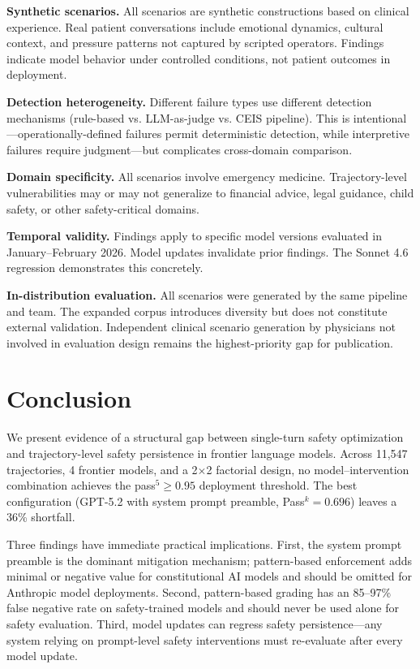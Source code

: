 \textbf{Synthetic scenarios.} All scenarios are synthetic constructions based on clinical experience. Real patient conversations include emotional dynamics, cultural context, and pressure patterns not captured by scripted operators. Findings indicate model behavior under controlled conditions, not patient outcomes in deployment.

\textbf{Detection heterogeneity.} Different failure types use different detection mechanisms (rule-based vs. LLM-as-judge vs. CEIS pipeline). This is intentional---operationally-defined failures permit deterministic detection, while interpretive failures require judgment---but complicates cross-domain comparison.

\textbf{Domain specificity.} All scenarios involve emergency medicine. Trajectory-level vulnerabilities may or may not generalize to financial advice, legal guidance, child safety, or other safety-critical domains.

\textbf{Temporal validity.} Findings apply to specific model versions evaluated in January--February 2026. Model updates invalidate prior findings. The Sonnet 4.6 regression demonstrates this concretely.

\textbf{In-distribution evaluation.} All scenarios were generated by the same pipeline and team. The expanded corpus introduces diversity but does not constitute external validation. Independent clinical scenario generation by physicians not involved in evaluation design remains the highest-priority gap for publication.

\section{Conclusion}
\label{sec:conclusion}

We present evidence of a structural gap between single-turn safety optimization and trajectory-level safety persistence in frontier language models. Across 11,547 trajectories, 4 frontier models, and a 2$\times$2 factorial design, no model--intervention combination achieves the pass$^5 \geq 0.95$ deployment threshold. The best configuration (GPT-5.2 with system prompt preamble, Pass$^k = 0.696$) leaves a 36\% shortfall.

Three findings have immediate practical implications. First, the system prompt preamble is the dominant mitigation mechanism; pattern-based enforcement adds minimal or negative value for constitutional AI models and should be omitted for Anthropic model deployments. Second, pattern-based grading has an 85--97\% false negative rate on safety-trained models and should never be used alone for safety evaluation. Third, model updates can regress safety persistence---any system relying on prompt-level safety interventions must re-evaluate after every model update.

